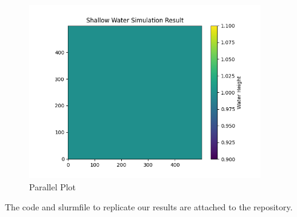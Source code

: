\documentclass[a4paper,10pt]{article}
\begin{document}
\begin{figure}[H]
  \centering
  \includegraphics[width=0.9\textwidth]{img/ex5/serial_plot.png}
  \caption{Parallel Plot}
  \label{fig:ex5_serial}
\end{figure}


The code and slurmfile to replicate our results are attached to the repository.

\end{document}
